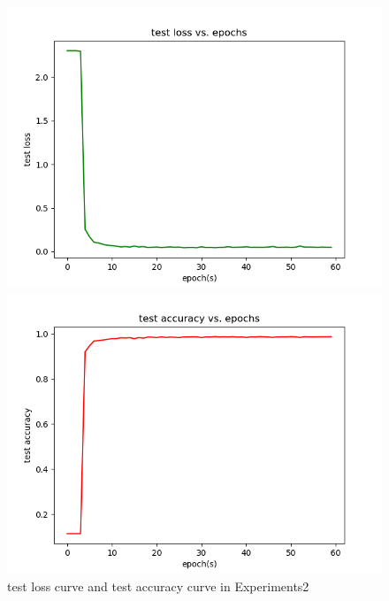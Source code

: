 \documentclass{elegantbook}
\begin{document}
\begin{figure}[!h]
	\centering
	\begin{minipage}[t]{0.48\textwidth}
		\centering
		\includegraphics[width=\textwidth]{../results/testloss2}
	\end{minipage}
	\begin{minipage}[t]{0.48\textwidth}
		\centering
		\includegraphics[width=\textwidth]{../results/testacc2}
	\end{minipage}
	\caption{\label{testres2}test loss curve and test accuracy curve in Experiments2}
\end{figure}
\end{document}

